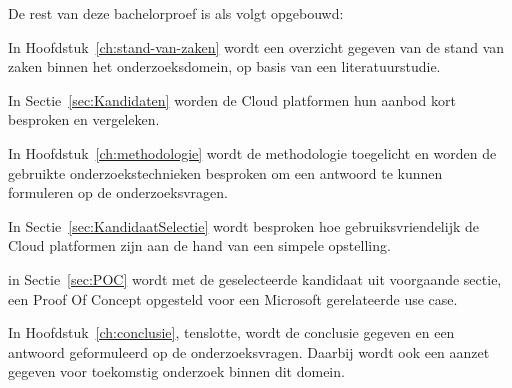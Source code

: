 De rest van deze bachelorproef is als volgt opgebouwd:

In Hoofdstuk~\ref{ch:stand-van-zaken} wordt een overzicht gegeven van de stand van zaken binnen het onderzoeksdomein, op basis van een literatuurstudie.

In Sectie~\ref{sec:Kandidaten} worden de Cloud platformen hun aanbod kort besproken en vergeleken.

In Hoofdstuk~\ref{ch:methodologie} wordt de methodologie toegelicht en worden de gebruikte onderzoekstechnieken besproken om een antwoord te kunnen formuleren op de onderzoeksvragen.

In Sectie~\ref{sec:KandidaatSelectie} wordt besproken hoe gebruiksvriendelijk de Cloud platformen zijn aan de hand van een simpele opstelling.

in Sectie~\ref{sec:POC} wordt met de geselecteerde kandidaat uit voorgaande sectie, een Proof Of Concept opgesteld voor een Microsoft gerelateerde use case.

In Hoofdstuk~\ref{ch:conclusie}, tenslotte, wordt de conclusie gegeven en een antwoord geformuleerd op de onderzoeksvragen. Daarbij wordt ook een aanzet gegeven voor toekomstig onderzoek binnen dit domein.

